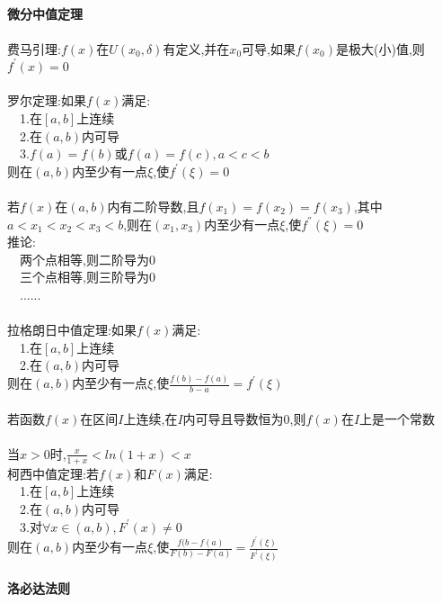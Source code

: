 \documentclass{article}
\begin{document}
\begin{flushleft}
	\fontsize{24pt}{30pt}\selectfont
	
	~\\ \textbf{微分中值定理} \\~\\
	
	费马引理:$f(x)$在$U(x_0,\delta)$有定义,并在$x_0$可导,如果$f(x_0)$是极大(小)值,则$f^{'}(x)=0$\\
	~\\
	罗尔定理:如果$f(x)$满足:\\
	\ \ 1.在$[a,b]$上连续\\
	\ \ 2.在$(a,b)$内可导\\
	\ \ 3.$f(a)=f(b)$或$f(a)=f(c), a<c<b$\\
	则在$(a,b)$内至少有一点$\xi$,使$f^{'}(\xi)=0$\\
	~\\
	若$f(x)$在$(a,b)$内有二阶导数,且$f(x_1)=f(x_2)=f(x_3)$,其中$a<x_1<x_2<x_3<b$,则在$(x_1,x_3)$内至少有一点$\xi$,使$f^{''}(\xi)=0$\\
	推论:\\
	\ \ 两个点相等,则二阶导为0\\
	\ \ 三个点相等,则三阶导为0\\
	\ \ ......\\
	~\\
	拉格朗日中值定理:如果$f(x)$满足:\\
	\ \ 1.在$[a,b]$上连续\\
	\ \ 2.在$(a,b)$内可导\\
	则在$(a,b)$内至少有一点$\xi$,使$\frac{f(b)-f(a)}{b-a}=f^{'}(\xi)$\\
	~\\
	若函数$f(x)$在区间$I$上连续,在$I$内可导且导数恒为0,则$f(x)$在$I$上是一个常数\\
	~\\
	当$x>0$时,$\frac{x}{1+x}<ln(1+x)<x$\\
	柯西中值定理:若$f(x)$和$F(x)$满足:\\
	\ \ 1.在$[a,b]$上连续\\
	\ \ 2.在$(a,b)$内可导\\
	\ \ 3.对$\forall x\in (a,b),F^{'}(x)\neq 0$\\
	则在$(a,b)$内至少有一点$\xi$,使$\frac{f(b-f(a)}{F(b)-F(a)}=\frac{f^{'}(\xi)}{F^{'}(\xi)}$\\
	
	~\\ \textbf{洛必达法则} \\~\\
	

\end{flushleft}
\end{document}
